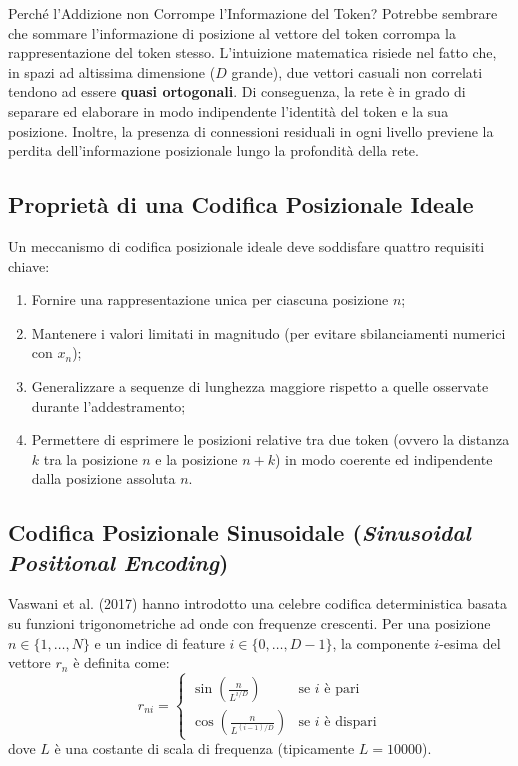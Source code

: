 \begin{observation}{Perché l'Addizione non Corrompe l'Informazione del Token?}
Potrebbe sembrare che sommare l'informazione di posizione al vettore del token corrompa la rappresentazione del token stesso. L'intuizione matematica risiede nel fatto che, in spazi ad altissima dimensione (\(D\) grande), due vettori casuali non correlati tendono ad essere \textbf{quasi ortogonali}. Di conseguenza, la rete è in grado di separare ed elaborare in modo indipendente l'identità del token e la sua posizione. Inoltre, la presenza di connessioni residuali in ogni livello previene la perdita dell'informazione posizionale lungo la profondità della rete.
\end{observation}

\subsection{Proprietà di una Codifica Posizionale Ideale}
Un meccanismo di codifica posizionale ideale deve soddisfare quattro requisiti chiave:
\begin{enumerate}
    \item Fornire una rappresentazione unica per ciascuna posizione \(n\);
    \item Mantenere i valori limitati in magnitudo (per evitare sbilanciamenti numerici con \(x_n\));
    \item Generalizzare a sequenze di lunghezza maggiore rispetto a quelle osservate durante l'addestramento;
    \item Permettere di esprimere le posizioni relative tra due token (ovvero la distanza \(k\) tra la posizione \(n\) e la posizione \(n+k\)) in modo coerente ed indipendente dalla posizione assoluta \(n\).
\end{enumerate}

\subsection{Codifica Posizionale Sinusoidale (\textit{Sinusoidal Positional Encoding})}
Vaswani et al. (2017) hanno introdotto una celebre codifica deterministica basata su funzioni trigonometriche ad onde con frequenze crescenti. Per una posizione \(n \in \{1, \dots, N\}\) e un indice di feature \(i \in \{0, \dots, D-1\}\), la componente \(i\)-esima del vettore \(r_n\) è definita come:
\begin{equation}
r_{ni} = \begin{cases}
\sin\left( \frac{n}{L^{i/D}} \right) & \text{se } i \text{ è pari} \\[8pt]
\cos\left( \frac{n}{L^{(i-1)/D}} \right) & \text{se } i \text{ è dispari}
\end{cases} \label{eq:sinusoidal_pe}
\end{equation}
dove \(L\) è una costante di scala di frequenza (tipicamente \(L = 10000\)).

